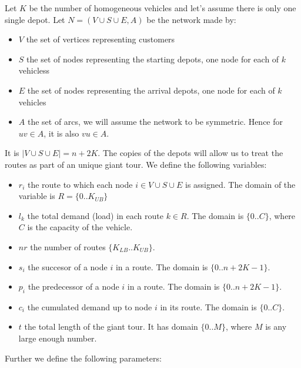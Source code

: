 \newpage
\begin{solution}


Let $K$ be the number of homogeneous vehicles and let's assume there is
only one single depot. Let $N=(V\cup S\cup E,A)$ be the network made by: 

\begin{itemize}
\item $V$  the set of vertices representing customers
\item $S$  the set of nodes representing the starting depots, one node
  for each of $k$ vehicless
\item $E$ the set of nodes representing the arrival depots, one node for
  each of $k$ vehicles
\item $A$ the set of arcs, we will assume the network to be symmetric. Hence for $uv\in A$, it is also $vu\in A$.
\end{itemize}
It is $|V\cup S\cup E|=n+2K$. The copies of the depots will allow us to
treat the routes as part of an unique giant tour.  We define the
following variables:
\begin{itemize}

\item $r_i$ the route to which each node $i \in V\cup S\cup E$ is assigned. The
  domain of the variable is $R=\{0..K_{UB}\}$

\item $l_k$ the total demand (load) in each route $k \in R$. The domain
  is $\{0..C\}$, where $C$ is the capacity of the vehicle.

\item $nr$ the number of routes $\{K_{LB}..K_{UB}\}$.

\item $s_i$ the succesor of a node $i$ in a route. The domain is
  $\{0..n+2K-1\}$.

\item $p_i$ the predecessor of a node $i$ in a route. The domain is
  $\{0..n+2K-1\}$.

\item $c_i$ the cumulated demand up to node $i$ in its route. The domain
  is $\{0..C\}$.
	
\item $t$ the total length of the giant tour. It has domain $\{0..M\}$,
  where $M$ is any large enough number.

\end{itemize}

Further we define the following parameters:
\begin{itemize}


\end{itemize}
\end{solution}
